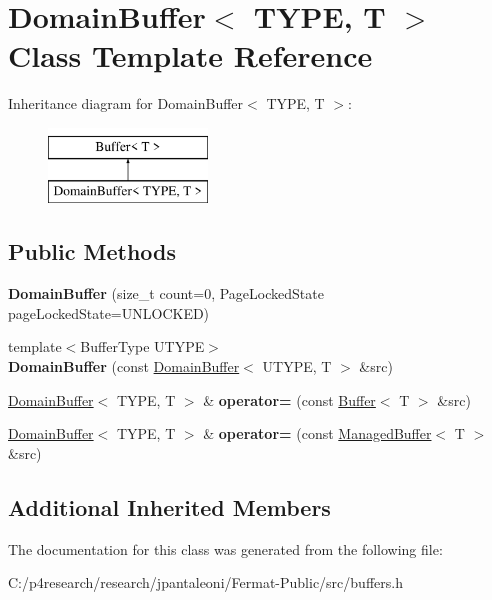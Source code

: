 \hypertarget{class_domain_buffer}{}\section{Domain\+Buffer$<$ T\+Y\+PE, T $>$ Class Template Reference}
\label{class_domain_buffer}
Inheritance diagram for Domain\+Buffer$<$ T\+Y\+PE, T $>$\+:\begin{figure}[H]
\begin{center}
\leavevmode
\includegraphics[height=2.000000cm]{class_domain_buffer}
\end{center}
\end{figure}
\subsection*{Public Methods}
\begin{DoxyCompactItemize}
\item 
\mbox{\label{class_domain_buffer_af50ae94cdeca23bc7d4530ca7f26c88a}} 
{\bfseries Domain\+Buffer} (size\+\_\+t count=0, Page\+Locked\+State page\+Locked\+State=U\+N\+L\+O\+C\+K\+ED)
\item 
\mbox{\label{class_domain_buffer_a74a746fb300c611786190a299510c0f7}} 
{\footnotesize template$<$Buffer\+Type U\+T\+Y\+PE$>$ }\\{\bfseries Domain\+Buffer} (const \hyperlink{class_domain_buffer}{Domain\+Buffer}$<$ U\+T\+Y\+PE, T $>$ \&src)
\item 
\mbox{\label{class_domain_buffer_a382571a0b89cae8fc5f433a149e89a38}} 
\hyperlink{class_domain_buffer}{Domain\+Buffer}$<$ T\+Y\+PE, T $>$ \& {\bfseries operator=} (const \hyperlink{class_buffer}{Buffer}$<$ T $>$ \&src)
\item 
\mbox{\label{class_domain_buffer_a0d68f0e89c0ea8bec10bd748fc003b35}} 
\hyperlink{class_domain_buffer}{Domain\+Buffer}$<$ T\+Y\+PE, T $>$ \& {\bfseries operator=} (const \hyperlink{class_managed_buffer}{Managed\+Buffer}$<$ T $>$ \&src)
\end{DoxyCompactItemize}
\subsection*{Additional Inherited Members}


The documentation for this class was generated from the following file\+:\begin{DoxyCompactItemize}
\item 
C\+:/p4research/research/jpantaleoni/\+Fermat-\/\+Public/src/buffers.\+h\end{DoxyCompactItemize}
